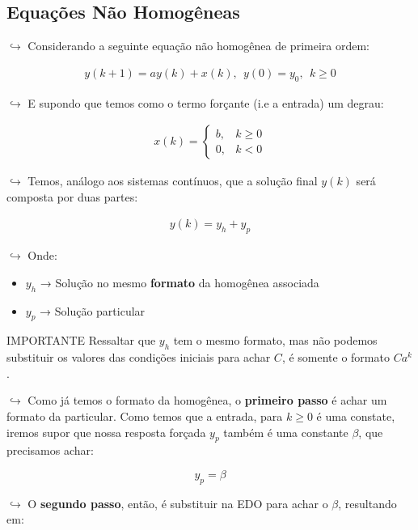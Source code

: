 \documentclass[]{article}
\providecommand{\tightlist}{%
  \setlength{\itemsep}{0pt}\setlength{\parskip}{0pt}}
\begin{document}
  \hypertarget{equauxe7uxf5es-nuxe3o-homoguxeaneas}{%
  \subsection{Equações Não
  Homogêneas}\label{equauxe7uxf5es-nuxe3o-homoguxeaneas}}

  \(\hookrightarrow\) Considerando a seguinte equação não homogênea de
  primeira ordem:

  \[
  \begin{align}
  y(k+1) = ay(k) + x(k),  \ \ y(0)=y_0,  \ \ k \ge 0
  \end{align}
  \]

  \(\hookrightarrow\) E supondo que temos como o termo forçante (i.e a
  entrada) um degrau:

  \[
  \begin{align}
  x(k) = \begin{cases}
  b,& k \ge 0 \\ 
  0, & k<0
  \end{cases}
  \end{align}
  \]

  \(\hookrightarrow\) Temos, análogo aos sistemas contínuos, que a solução
  final \(y(k)\) será composta por duas partes:

  \[
  \begin{align}
  y(k) = y_h + y_p
  \end{align}
  \]

  \(\hookrightarrow\) Onde:

  \begin{itemize}
  \tightlist
  \item
    \(y_h\) → Solução no mesmo \textbf{formato} da homogênea associada
  \item
    \(y_p\) → Solução particular
  \end{itemize}

  IMPORTANTE Ressaltar que \(y_h\) tem o mesmo formato, mas não podemos
  substituir os valores das condições iniciais para achar \(C\), é somente
  o formato \(Ca^k\).

  \(\hookrightarrow\) Como já temos o formato da homogênea, o
  \textbf{primeiro passo} é achar um formato da particular. Como temos que
  a entrada, para \(k \ge 0\) é uma constate, iremos supor que nossa
  resposta forçada \(y_p\) também é uma constante \(\beta\), que
  precisamos achar:

  \[
  y_p = \beta
  \]

  \(\hookrightarrow\) O \textbf{segundo passo}, então, é substituir na EDO
  para achar o \(\beta\), resultando em:
\end{document}
